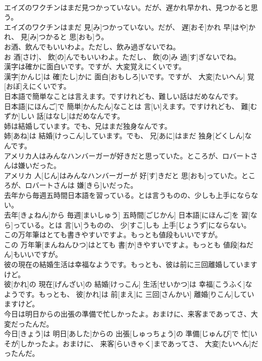 \documentclass[8pt]{extreport}
\begin{document}
\begin{CJK}{UTF8}{min}
\\	エイズのワクチンはまだ見つかっていない。だが、遅かれ早かれ、見つかると思う。	
\\	エイズのワクチンはまだ 見[み]つかっていない。だが、 遅[おそ]かれ 早[はや]かれ、 見[み]つかると 思[おも]う。
\\	お酒、飲んでもいいわよ。ただし、飲み過ぎないでね。	
\\	お 酒[さけ]、 飲[の]んでもいいわよ。ただし、 飲[の]み 過[す]ぎないでね。
\\	漢字は確かに面白いです。ですが、大変覚えにくいです。	
\\	漢字[かんじ]は 確[たし]かに 面白[おもしろ]いです。ですが、 大変[たいへん] 覚[おぼ]えにくいです。
\\	日本語で簡単なことは言えます。ですけれども、難しい話はだめなんです。	
\\	日本語[にほんご]で 簡単[かんたん]なことは 言[い]えます。ですけれども、 難[むずか]しい 話[はなし]はだめなんです。
\\	姉は結婚しています。でも、兄はまだ独身なんです。	
\\	姉[あね]は 結婚[けっこん]しています。でも、 兄[あに]はまだ 独身[どくしん]なんです。
\\	アメリカ人はみんなハンバーガーが好きだと思っていた。ところが、ロバートさんは嫌いだった。	
\\	アメリカ 人[じん]はみんなハンバーガーが 好[す]きだと 思[おも]っていた。ところが、ロバートさんは 嫌[きら]いだった。
\\	去年から毎週五時間日本語を習っている。とは言うものの、少しも上手にならない。	
\\	去年[きょねん]から 毎週[まいしゅう] 五時間[ごじかん] 日本語[にほんご]を 習[なら]っている。とは 言[い]うものの、 少[すこ]しも 上手[じょうず]にならない。
\\	この万年筆はとても書きやすいですよ。もっとも値段もいいですが。	
\\	この 万年筆[まんねんひつ]はとても 書[か]きやすいですよ。もっとも 値段[ねだん]もいいですが。
\\	彼の現在の結婚生活は幸福なようです。もっとも、彼は前に三回離婚していますけど。	
\\	彼[かれ]の 現在[げんざい]の 結婚[けっこん] 生活[せいかつ]は 幸福[こうふく]なようです。もっとも、 彼[かれ]は 前[まえ]に 三回[さんかい] 離婚[りこん]していますけど。
\\	今日は明日からの出張の準備で忙しかったよ。おまけに、来客まであってさ、大変だったんだ。	
\\	今日[きょう]は 明日[あした]からの 出張[しゅっちょう]の 準備[じゅんび]で 忙[いそが]しかったよ。おまけに、 来客[らいきゃく]まであってさ、 大変[たいへん]だったんだ。

\end{CJK}
\end{document}
